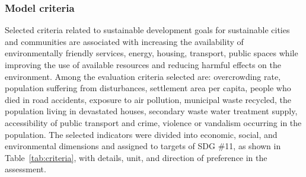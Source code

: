\documentclass[5p,times]{elsarticle}
\begin{document}
\subsubsection{Model criteria}
\label{sec:ModelCriteria}
Selected criteria related to sustainable development goals for sustainable cities and communities are associated with increasing the availability of environmentally friendly services, energy, housing, transport, public spaces while improving the use of available resources and reducing harmful effects on the environment. Among the evaluation criteria selected are: overcrowding rate, population suffering from disturbances, settlement area per capita, people who died in road accidents, exposure to air pollution, municipal waste recycled, the population living in devastated houses, secondary waste water treatment supply, accessibility of public transport and crime, violence or vandalism occurring in the population. The selected indicators were divided into economic, social, and environmental dimensions and assigned to targets of SDG \#11, as shown in Table~\ref{tab:criteria}, with details, unit, and direction of preference in the assessment.
\end{document}
